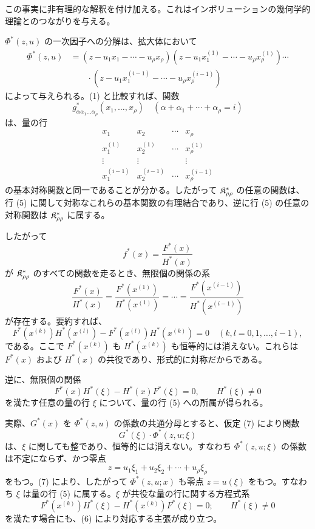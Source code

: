 \documentclass[11pt]{jlreq}
\begin{document}
この事実に非有理的な解釈を付け加える。これはインボリューションの幾何学的理論とのつながりを与える。

$\Phi^*(z,u)$ の一次因子への分解は、拡大体において
\begin{equation}
\begin{aligned}
 \Phi^*(z,u)&=(z-u_1x_1-\cdots-u_\rho x_\rho)
 (z-u_1x_1^{(1)}-\cdots-u_\rho x_\rho^{(1)})\cdots\\
 &\qquad\cdot
 (z-u_1x_1^{(i-1)}-\cdots-u_\rho x_\rho^{(i-1)})
\end{aligned}
\tag{4}
\end{equation}
によって与えられる。(1) と比較すれば、関数
\[
  g^*_{\alpha\alpha_1\ldots\alpha_\rho}(x_1,
  \ldots,x_\rho)\quad(\alpha+\alpha_1+\cdots+\alpha_\rho=i)
\]
は、量の行
\begin{equation}
\begin{array}{cccc}
  x_1 & x_2 & \cdots & x_\rho\\
  x_1^{(1)} & x_2^{(1)} & \cdots & x_\rho^{(1)}\\
  \vdots & \vdots & & \vdots\\
  x_1^{(i-1)} & x_2^{(i-1)} & \cdots & x_\rho^{(i-1)}
\end{array}
\tag{5}
\end{equation}
の基本対称関数と同一であることが分かる。したがって $\mathfrak{K}^*_{\rho\rho}$ の任意の関数は、行 (5) に関して対称なこれらの基本関数の有理結合であり、逆に行 (5) の任意の対称関数は $\mathfrak{K}^*_{\rho\rho}$ に属する。

したがって
\[
  f^*(x)=\frac{F^*(x)}{H^*(x)}
\]
が $\mathfrak{K}^*_{\rho\rho}$ のすべての関数を走るとき、無限個の関係の系
\begin{equation}
  \frac{F^*(x)}{H^*(x)}=
  \frac{F^*(x^{(1)})}{H^*(x^{(1)})}=\cdots=
  \frac{F^*(x^{(i-1)})}{H^*(x^{(i-1)})}
\tag{6}
\end{equation}
が存在する。要約すれば、
\[
  F^*(x^{(k)})H^*(x^{(l)})-
  F^*(x^{(l)})H^*(x^{(k)})=0
  \quad(k,l=0,1,\ldots,i-1),
\]
である。ここで $F^*(x^{(k)})$ も $H^*(x^{(k)})$ も恒等的には消えない。これらは $F^*(x)$ および $H^*(x)$ の共役であり、形式的に対称だからである。

逆に、無限個の関係
\begin{equation}
  F^*(x)H^*(\xi)-H^*(x)F^*(\xi)=0,
  \qquad H^*(\xi)\ne0
\tag{7}
\end{equation}
を満たす任意の量の行 $\xi$ について、量の行 (5) への所属が得られる。

実際、$G^*(x)$ を $\Phi^*(z,u)$ の係数の共通分母とすると、仮定 (7) により関数
\[
  G^*(\xi)\cdot\Phi^*(z,u;\xi)
\]
は、$\xi$ に関しても整であり、恒等的には消えない。すなわち $\Phi^*(z,u;\xi)$ の係数は不定にならず、かつ零点
\[
  z=u_1\xi_1+u_2\xi_2+\cdots+u_\rho\xi_\rho
\]
をもつ。(7) により、したがって $\Phi^*(z,u;x)$ も零点 $z=u(\xi)$ をもつ。すなわち $\xi$ は量の行 (5) に属する。$\xi$ が共役な量の行に関する方程式系
\[
  F^*(x^{(k)})H^*(\xi)-H^*(x^{(k)})F^*(\xi)=0;
  \qquad H^*(\xi)\ne0
\]
を満たす場合にも、(6) により対応する主張が成り立つ。
\end{document}
